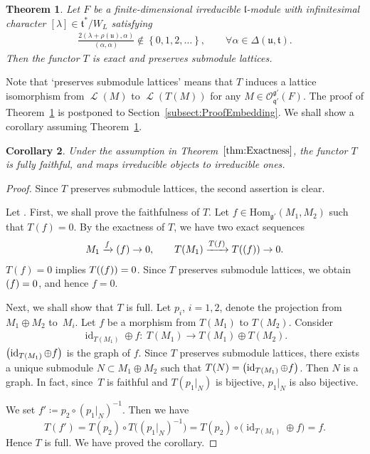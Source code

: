 \documentclass[10pt,a4paper]{amsart}
\numberwithin{equation}{section}
\newtheorem{Theorem}{Theorem}[section]
\newtheorem{Corollary}[Theorem]{Corollary}
\theoremstyle{definition}
\newcommand{\set}[1]{\left\{#1 \right\}}
\newcommand{\Hom}{\mathrm{Hom}}
\DeclareMathOperator{\id}{id}
\newcommand{\lie}[1]{\mathfrak{#1}}
\newcommand{\BGGcat}[2]{\mathcal{O}_{\lie{#2}}^{\lie{#1}}}
\let\Im\relax
\DeclareMathOperator{\Im}{\mathrm{Im}}
\newcommand{\rhog}[1]{\rho(#1)}
\DeclareMathOperator{\lattice}{\mathcal{L}}
\begin{document}
\begin{Theorem}\label{thm:Exactness}
	Let $F$ be a finite-dimensional irreducible $\lie{l}$-module with infinitesimal character $[\lambda] \in \lie{t}^*/W_L$
	satisfying
	\begin{align*}
		\frac{2(\lambda+\rhog{\lie{u}}, \alpha)}{(\alpha, \alpha)} \not \in \set{0, 1, 2, \ldots}, \qquad \forall \alpha \in \Delta(\lie{u}, \lie{t}).
	\end{align*}
	Then the functor $T$ is exact and preserves submodule lattices.
\end{Theorem}


Note that `preserves submodule lattices' means that $T$ induces a lattice isomorphism from $\lattice(M)$ to $\lattice(T(M))$ for any $M \in \BGGcat{g'}{q'}(F)$.
The proof of Theorem~\ref{thm:Exactness} is postponed to Section~\ref{subsect:ProofEmbedding}.
We shall show a corollary assuming Theorem~\ref{thm:Exactness}.


\begin{Corollary}\label{cor:CategoryEquivalence}
	Under the assumption in Theorem~$\ref{thm:Exactness}$,
	the functor $T$ is fully faithful, and maps irreducible objects to irreducible ones.
\end{Corollary}



\begin{proof}
	Since $T$ preserves submodule lattices, the second assertion is clear.

	Let \smash{$M_1, M_2 \in \BGGcat{g'}{q'}(F)$}.
	First, we shall prove the faithfulness of $T$.
	Let $f \in \Hom_{\lie{g}'}(M_1, M_2)$ such that $T(f)=0$.
	By the exactness of $T$, we have two exact sequences
	\begin{align*}
		M_1 \xrightarrow{f} \Im(f) \rightarrow 0, \qquad T(M_1) \xrightarrow{T(f)} T(\Im(f)) \rightarrow 0.
	\end{align*}
	$T(f)=0$ implies $T(\Im(f))=0$.
	Since $T$ preserves submodule lattices, we obtain $\Im(f)=0$, and hence $f=0$.

	Next, we shall show that $T$ is full.
	Let $p_i$, $i = 1, 2$, denote the projection from $M_1 \oplus M_2$ to~$M_i$.
	Let $f$ be a morphism from $T(M_1)$ to $T(M_2)$.
	Consider
	\begin{align*}
		\id_{T(M_1)}\oplus f\colon\ T(M_1) \rightarrow T(M_1) \oplus T(M_2).
	\end{align*}
	$\Im\bigl(\id_{T(M_1)} \oplus f\bigr)$ is the graph of $f$.
	Since $T$ preserves submodule lattices, there exists a unique submodule $N \subset M_1 \oplus M_2$
	such that $T(N)=\Im\bigl(\id_{T(M_1)}\oplus f\bigr)$.
	Then $N$ is a graph.
	In fact, since~$T$ is faithful and $T(p_1|_N)$ is bijective,
	$p_1|_N$ is also bijective.

	We set $f'\coloneq p_2\circ(p_1|_N)^{-1}$.
	Then we have
 \[
 T(f')=T(p_2)\circ T\bigl((p_1|_N)^{-1}\bigr)=T(p_2)\circ \bigl(\id_{T(M_1)}\oplus f\bigr)=f.
 \]
	Hence $T$ is full.
	We have proved the corollary.
\end{proof}
\end{document}
